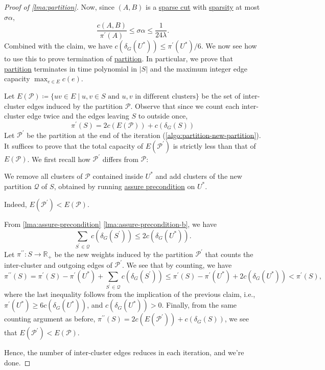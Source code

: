 \begin{proof}[Proof of \autoref{lma:partition}]
	Now, since \((A, B)\) is a \hyperref[prb:non-uniform-sparsest-cut]{sparse cut} with \hyperref[def:sparsity]{sparsity} at most \(\sigma \alpha \),
	\[
		\frac{c(A, B)}{\pi ^{\prime} (A)}
		\leq \sigma \alpha
		\leq \frac{1}{24\lambda }.
	\]
	Combined with the claim, we have \(c(\delta _G(U^{\ast} )) \leq \pi ^{\prime} (U^{\ast} ) / 6\). We now see how to use this to prove termination of \hyperref[algo:partition]{partition}. In particular, we prove that \hyperref[algo:partition]{partition} terminates in time polynomial in \(\lvert S \rvert \) and the maximum integer edge capacity \(\max _{e \in E} c(e)\).

	Let \(E(\mathcal{P} ) \coloneqq \{ uv \in E  \mid u, v \in S \text{ and } u, v \text{ in different clusters} \} \) be the set of inter-cluster edges induced by the partition \(\mathcal{P} \). Observe that since we count each inter-cluster edge twice and the edges leaving \(S\) to outside once,
	\[
		\pi ^{\prime} (S)
		= 2c(E(\mathcal{P} ))+ c(\delta _G(S))
	\]
	Let \(\mathcal{P} ^{\prime} \) be the partition at the end of the iteration (\autoref{algo:partition-new-partition}). It suffices to prove that the total capacity of \(E(\mathcal{P} ^{\prime} )\) is strictly less than that of \(E(\mathcal{P} )\). We first recall how \(\mathcal{P} ^{\prime} \) differs from \(\mathcal{P} \):
	\begin{prev}
		We remove all clusters of \(\mathcal{P} \) contained inside \(U^{\ast} \) and add clusters of the new partition \(\mathcal{Q} \) of \(S\), obtained by running \hyperref[algo:assure-precondition]{assure precondition} on \(U^{\ast} \).
	\end{prev}

	\begin{claim}
		Indeed, \(E(\mathcal{P} ^{\prime} ) < E(\mathcal{P} )\).
	\end{claim}
	\begin{explanation}
		From \autoref{lma:assure-precondition} \autoref{lma:assure-precondition-b}, we have
		\[
			\sum_{S^{\prime} \in \mathcal{Q} } c(\delta _G(S^{\prime} ))
			\leq 2 c(\delta _G(U^{\ast} )).
		\]
		Let \(\pi ^{\prime\prime} \colon S \to \mathbb{R} _+\) be the new weights induced by the partition \(\mathcal{P} ^{\prime} \) that counts the inter-cluster and outgoing edges of \(\mathcal{P} ^{\prime} \). We see that by counting, we have
		\[
			\pi ^{\prime\prime} (S)
			= \pi ^{\prime} (S) - \pi ^{\prime} (U^{\ast} ) + \sum_{S^{\prime} \in \mathcal{Q} } c(\delta _G(S^{\prime} ))
			\leq \pi ^{\prime} (S) - \pi ^{\prime} (U^{\ast} ) + 2c (\delta _G(U^{\ast} ))
			< \pi ^{\prime} (S),
		\]
		where the last inequality follows from the implication of the previous claim, i.e., \(\pi ^{\prime} (U^{\ast} ) \geq 6c(\delta _G(U^{\ast} ))\), and \(c(\delta _G(U^{\ast} )) > 0\). Finally, from the same counting argument as before, \(\pi ^{\prime\prime} (S) = 2c(E(\mathcal{P} ^{\prime} )) + c(\delta _G(S))\), we see that \(E(\mathcal{P} ^{\prime} ) < E(\mathcal{P} )\).
	\end{explanation}
	Hence, the number of inter-cluster edges reduces in each iteration, and we're done.
\end{proof}